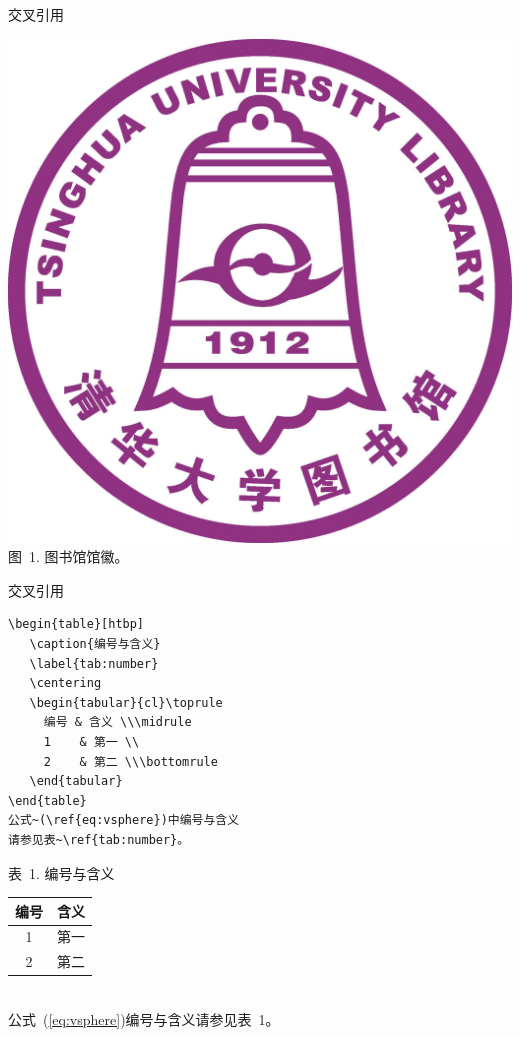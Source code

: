 \begin{frame}[fragile]{交叉引用}
\begin{minipage}{0.4\linewidth}
 \includegraphics[height=0.2\textheight]{libicon.jpg}\\
 {\footnotesize\heiti 图~1. 图书馆馆徽。}
  \end{minipage}
\end{frame}

\begin{frame}[fragile]{交叉引用}
\begin{minipage}{0.5\linewidth}
  \begin{verbatim}
\begin{table}[htbp]
   \caption{编号与含义}
   \label{tab:number}
   \centering
   \begin{tabular}{cl}\toprule
     编号 & 含义 \\\midrule
     1    & 第一 \\
     2    & 第二 \\\bottomrule
   \end{tabular}
\end{table}
公式~(\ref{eq:vsphere})中编号与含义
请参见表~\ref{tab:number}。
\end{verbatim}
\end{minipage}
\begin{minipage}{0.4\linewidth}
\centering
{\small 表~1. 编号与含义}\\[2pt]
 \begin{tabular}{cl}\toprule
编号 & 含义 \\\midrule
1 & 第一\\
2  & 第二\\\bottomrule
\end{tabular}\\[5pt]

\normalsize 公式~(\ref{eq:vsphere})编号与含义请参见表~1。
\end{minipage}
\end{frame}

